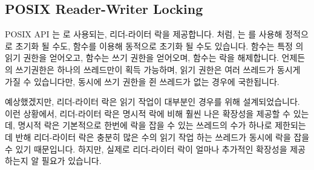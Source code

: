 \subsection{POSIX Reader-Writer Locking}
\label{sec:toolsoftrade:POSIX Reader-Writer Locking}

POSIX API 는  로 사용되는, 리더-라이터 락을 제공합니다.
 처럼,  는
 를 사용해 정적으로 초기화 될 수도,
 함수를 이용해 동적으로 초기화 될 수도 있습니다.
 함수는 특정  의 읽기 권한을
얻어오고,  함수는 쓰기 권한을 얻어오며,
 함수는 락을 해제합니다.
언제든  의 쓰기권한은 하나의 쓰레드만이 획득 가능하며,
읽기 권한은 여러 쓰레드가 동시게 가질 수 있습니다만, 동시에 쓰기 권한을 쥔
쓰레드가 없는 경우에 국한됩니다.

예상했겠지만, 리더-라이터 락은 읽기 작업이 대부분인 경우를 위해 설계되었습니다.
이런 상황에서, 리더-라이터 락은 명시적 락에 비해 훨씬 나은 확장성을 제공할 수
있는데, 명시적 락은 기본적으로 한번에 락을 잡을 수 있는 쓰레드의 수가 하나로
제한되는데 반해 리더-라이터 락은 충분히 많은 수의 읽기 작업 하는 쓰레드가
동시에 락을 잡을 수 있기 때문입니다.
하지만, 실제로 리더-라이터 락이 얼마나 추가적인 확장성을 제공하는지 알 필요가
있습니다.

